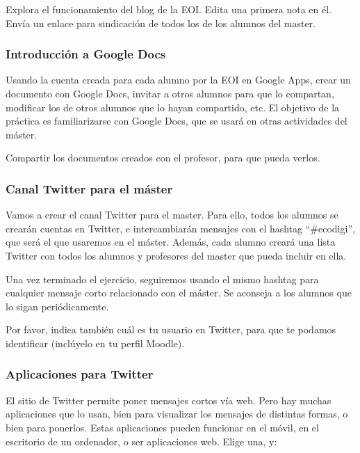 \documentclass[a4paper,12pt]{article}
\begin{document}
Explora el funcionamiento del blog de la EOI. Edita una primera nota en él. Envía un enlace para sindicación de todos los de los alumnos del master.

\subsubsection{Introducción a Google Docs}
\label{sub:googledocs}

Usando la cuenta creada para cada alumno por la EOI en Google Apps, crear un documento con Google Docs, invitar a otros alumnos para que lo compartan, modificar los de otros alumnos que lo hayan compartido, etc. El objetivo de la práctica es familiarizarse con Google Docs, que se usará en otras actividades del máster.

Compartir los documentos creados con el profesor, para que pueda verlos.

\subsubsection{Canal Twitter para el máster}
\label{sub:canaltwitter}

Vamos a crear el canal Twitter para el master. Para ello, todos los alumnos se crearán cuentas en Twitter, e intercambiarán mensajes con el hashtag ``\#ecodigi'', que será el que usaremos en el máster. Además, cada alumno creará una lista Twitter con todos los alumnos y profesores del master que pueda incluir en ella.

Una vez terminado el ejercicio, seguiremos usando el mismo hashtag para cualquier mensaje corto relacionado con el máster. Se aconseja a los alumnos que lo sigan periódicamente.

Por favor, indica también cuál es tu usuario en Twitter, para que te podamos identificar (inclúyelo en tu perfil Moodle).

\subsubsection{Aplicaciones para Twitter}
\label{sub:apptwitter}

El sitio de Twitter permite poner mensajes cortos vía web. Pero hay muchas aplicaciones que lo usan, bien para visualizar los mensajes de distintas formas, o bien para ponerlos. Estas aplicaciones pueden funcionar en el móvil, en el escritorio de un ordenador, o ser aplicaciones web. Elige una, y:
\end{document}
